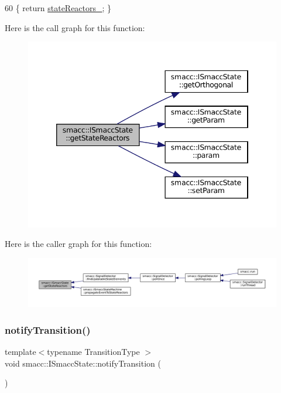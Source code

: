 \begin{DoxyCode}
60 \{ \textcolor{keywordflow}{return} \hyperlink{classsmacc_1_1ISmaccState_a7410a353b515f7b7357e94ef619a6c45}{stateReactors\_}; \}
\end{DoxyCode}
Here is the call graph for this function\+:
\nopagebreak
\begin{figure}[H]
\begin{center}
\leavevmode
\includegraphics[width=346pt]{classsmacc_1_1ISmaccState_acc40f4b3dd02a39242c7e23fe13c3e16_cgraph}
\end{center}
\end{figure}
Here is the caller graph for this function\+:
\nopagebreak
\begin{figure}[H]
\begin{center}
\leavevmode
\includegraphics[width=350pt]{classsmacc_1_1ISmaccState_acc40f4b3dd02a39242c7e23fe13c3e16_icgraph}
\end{center}
\end{figure}
\mbox{\label{classsmacc_1_1ISmaccState_a98df316afd79180d3c27a15a7d5dd1cf}} 
\subsubsection{\texorpdfstring{notify\+Transition()}{notifyTransition()}}
{\footnotesize\ttfamily template$<$typename Transition\+Type $>$ \\
void smacc\+::\+I\+Smacc\+State\+::notify\+Transition (\begin{DoxyParamCaption}{ }\end{DoxyParamCaption})}



